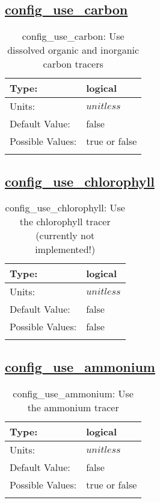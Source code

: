 \subsection[config\_use\_carbon]{\hyperref[sec:nm_tab_biogeochemistry]{config\_use\_carbon}}
\label{subsec:nm_sec_config_use_carbon}
\begin{center}
\begin{longtable}{| p{2.0in} || p{4.0in} |}
    \hline
    Type: & logical \\
    \hline
    Units: & $unitless$ \\
    \hline
    Default Value: & false \\
    \hline
    Possible Values: & true or false \\
    \hline
    \caption{config\_use\_carbon: Use dissolved organic and inorganic carbon tracers}
\end{longtable}
\end{center}
\subsection[config\_use\_chlorophyll]{\hyperref[sec:nm_tab_biogeochemistry]{config\_use\_chlorophyll}}
\label{subsec:nm_sec_config_use_chlorophyll}
\begin{center}
\begin{longtable}{| p{2.0in} || p{4.0in} |}
    \hline
    Type: & logical \\
    \hline
    Units: & $unitless$ \\
    \hline
    Default Value: & false \\
    \hline
    Possible Values: & false \\
    \hline
    \caption{config\_use\_chlorophyll: Use the chlorophyll tracer (currently not implemented!)}
\end{longtable}
\end{center}
\subsection[config\_use\_ammonium]{\hyperref[sec:nm_tab_biogeochemistry]{config\_use\_ammonium}}
\label{subsec:nm_sec_config_use_ammonium}
\begin{center}
\begin{longtable}{| p{2.0in} || p{4.0in} |}
    \hline
    Type: & logical \\
    \hline
    Units: & $unitless$ \\
    \hline
    Default Value: & false \\
    \hline
    Possible Values: & true or false \\
    \hline
    \caption{config\_use\_ammonium: Use the ammonium tracer}
\end{longtable}
\end{center}
